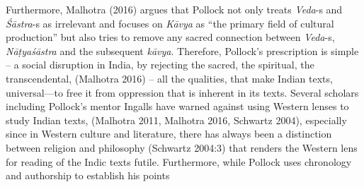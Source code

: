 Furthermore, Malhotra (2016) argues that Pollock not only treats \textsl{Veda}-s and \textsl{Śāstra}-s as irrelevant and focuses on \textsl{Kāvya} as “the primary field of cultural production” but also tries to remove any sacred connection between \textsl{Veda}-s, \textsl{Nāṭyaśāstra} and the subsequent \textsl{kāvya}. Therefore, Pollock’s prescription is simple -- a social disruption in India, by rejecting the sacred, the spiritual, the transcendental, (Malhotra 2016) -- all the qualities, that make Indian texts, universal---to free it from oppression that is inherent in its texts. Several scholars including Pollock’s mentor Ingalls have warned against using Western lenses to study Indian texts, (Malhotra 2011, Malhotra 2016, Schwartz 2004), especially since in Western culture and literature, there has always been a distinction between religion and philosophy (Schwartz 2004:3) that renders the Western lens for reading of the Indic texts futile. Furthermore, while Pollock uses chronology and authorship to establish his points
